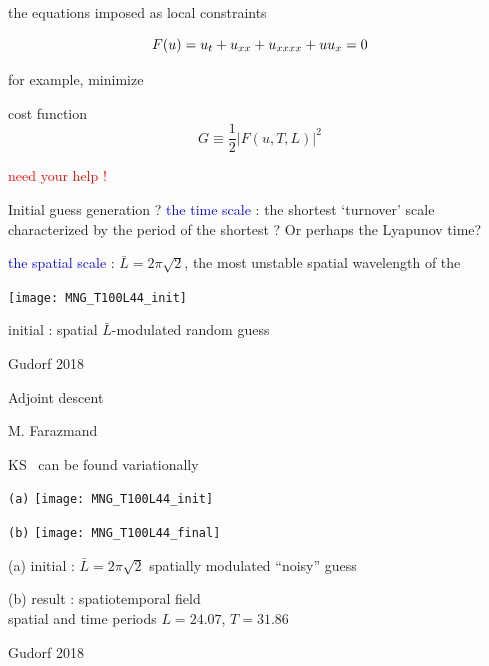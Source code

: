 \begin{frame}{the equations imposed as local constraints}
\begin{block}{\KSe}
\[
F(u) = u_t + u_{x x} + u_{x x x x} + u u_{x} = 0
\]
\end{block}
\bigskip\bigskip
for example, minimize
\begin{block}{cost function}
\[
G \equiv \frac{1}{2} |F(u,T,L)|^2
\]
\end{block}
\vfill\hfill\textcolor{red}{\Huge need your help !}
\end{frame}

\begin{frame}{Initial guess generation ?}
 \textcolor{blue}{the time scale} : the shortest
`turnover' scale characterized by the period of the shortest \po? Or perhaps
the Lyapunov time?

\bigskip

\textcolor{blue}{the spatial scale} :
$\bar{L}=2\pi\sqrt{2}$, the  most unstable spatial wavelength of the \KS

\bigskip

\begin{minipage}[height=.32\textheight]{.30\textwidth}
\texttt{[image: MNG\_T100L44\_init]}
\end{minipage}

\medskip
initial : spatial $\bar{L}$-modulated random guess

\vfill\hfill        Gudorf 2018
\end{frame}

\begin{frame}{Adjoint descent}

\vfill\hfill
M. Farazmand
\end{frame}

\begin{frame}{KS \twots\ can be found variationally}
\begin{minipage}[height=.32\textheight]{.30\textwidth}
\centering \small{\texttt{(a)}}
\texttt{[image: MNG\_T100L44\_init]}
\end{minipage}
\begin{minipage}[height=.32\textheight]{.30\textwidth}
\centering \small{\texttt{(b)}}
\texttt{[image: MNG\_T100L44\_final]}
\end{minipage}

\medskip
(a) initial : $\bar{L}=2\pi\sqrt{2}$ spatially modulated ``noisy'' guess

(b) result : spatiotemporal field \\
 spatial and time periods
 $L=24.07$, $T=31.86$

\vfill\hfill        Gudorf 2018
\end{frame}

